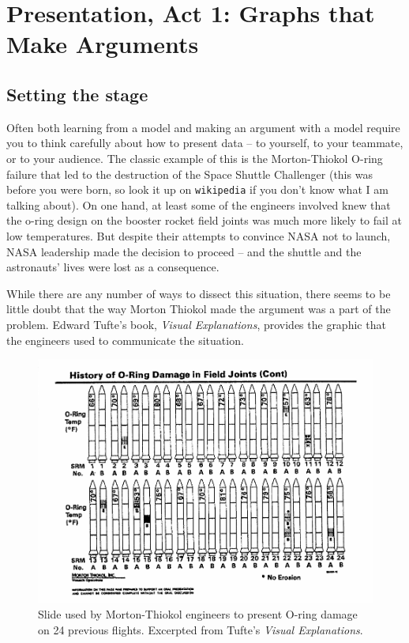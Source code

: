 
\chapter{Presentation, Act 1: Graphs that Make Arguments}

\section{Setting the stage}
Often both learning from a model and making an argument with a model require you to think carefully about how to present data -- to yourself, to your teammate, or to your audience.  The classic example of this is the Morton-Thiokol O-ring failure that led to the destruction of the Space Shuttle Challenger (this was before you were born, so look it up on {\tt wikipedia} if you don't know what I am talking about).  On one hand, at least some of the engineers involved knew that the o-ring design on the booster rocket field joints was much more likely to fail at low temperatures.     But despite their attempts to convince NASA not to launch, NASA leadership made the decision to proceed -- and the shuttle and the astronauts' lives were lost as a consequence.  

While there are any number of ways to dissect this situation, there seems to be little doubt that the way Morton Thiokol made the argument  was a part of the problem.  Edward Tufte's book, {\it Visual Explanations}, provides the graphic that the engineers used to communicate the situation.


\begin{figure}[h!]
\includegraphics[width=4.5in]{figs/Thiokol1}
\caption{Slide used by Morton-Thiokol engineers to present O-ring damage on 24 previous flights.  Excerpted from Tufte's {\it Visual Explanations}.}
\end{figure}

